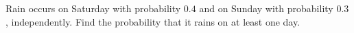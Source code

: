Rain occurs on Saturday with probability $0.4$ and on Sunday with probability $0.3$, independently. Find the probability that it rains on at least one day.
